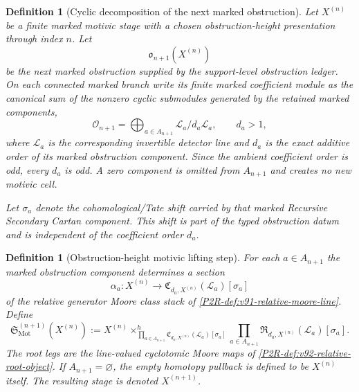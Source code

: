 \documentclass[11pt]{article}
\newtheorem{definition}[theorem]{Definition}
\theoremstyle{remark}
\newcommand{\Mot}{\mathrm{Mot}}
\begin{document}
\begin{definition}[Cyclic decomposition of the next marked obstruction]
\label{def:recursive-obstruction-cyclic-decomposition}
Let $X^{(n)}$ be a finite marked motivic stage with a chosen obstruction-height
presentation through index $n$.  Let
\[
 \mathfrak o_{n+1}(X^{(n)})
\]
be the next marked obstruction supplied by the support-level obstruction ledger.  On
each connected marked branch write its finite marked coefficient module as the canonical
sum of the nonzero cyclic submodules generated by the retained marked components,
\[
 \mathscr O_{n+1}
 =\bigoplus_{a\in A_{n+1}}\mathscr L_a/d_a\mathscr L_a,
 \qquad d_a>1,
\]
where $\mathscr L_a$ is the corresponding invertible detector line and $d_a$ is the
exact additive order of its marked obstruction component.  Since the ambient coefficient
order is odd, every $d_a$ is odd.  A zero component is omitted from $A_{n+1}$ and creates
no new motivic cell.

Let $\sigma_a$ denote the cohomological/Tate shift carried by that marked Recursive
Secondary Cartan component.  This shift is part of the typed obstruction datum and is
independent of the coefficient order $d_a$.
\end{definition}

\begin{definition}[Obstruction-height motivic lifting step]
\label{def:genuine-recursive-motivic-successor}
For each $a\in A_{n+1}$ the marked obstruction component determines a section
\[
 \alpha_a:X^{(n)}\longrightarrow
 \mathfrak C_{d_a,X^{(n)}}(\mathscr L_a)[\sigma_a]
\]
of the relative generator Moore class stack of
\cref{P2R-def:v91-relative-moore-line}.  Define
\begin{equation}\label{eq:genuine-recursive-motivic-successor}
 \boxed{
 \mathfrak S_{\Mot}^{(n+1)}(X^{(n)})
 :=X^{(n)}
 \times^h_{\displaystyle\prod_{a\in A_{n+1}}
   \mathfrak C_{d_a,X^{(n)}}(\mathscr L_a)[\sigma_a]}
 \displaystyle\prod_{a\in A_{n+1}}
   \mathfrak R_{d_a,X^{(n)}}(\mathscr L_a)[\sigma_a].}
\end{equation}
The root legs are the line-valued cyclotomic Moore maps of
\cref{P2R-def:v92-relative-root-object}.  If $A_{n+1}=\varnothing$, the empty
homotopy pullback is defined to be $X^{(n)}$ itself.  The resulting stage is denoted
$X^{(n+1)}$.
\end{definition}
\end{document}

